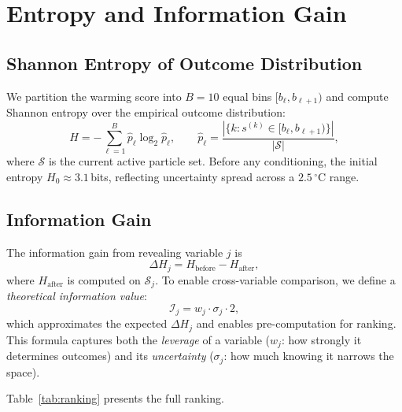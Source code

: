 \documentclass[10pt,twocolumn]{article}
\begin{document}
\section{Entropy and Information Gain}

\subsection{Shannon Entropy of Outcome Distribution}

We partition the warming score into $B=10$ equal bins
$[b_\ell, b_{\ell+1})$ and compute Shannon entropy over the
empirical outcome distribution:
\[
  H = -\sum_{\ell=1}^{B} \hat{p}_\ell \log_2 \hat{p}_\ell,
  \qquad
  \hat{p}_\ell = \frac{|\{k : s^{(k)} \in [b_\ell,b_{\ell+1})\}|}{|\mathcal{S}|},
\]
where $\mathcal{S}$ is the current active particle set.  Before any
conditioning, the initial entropy $H_0 \approx 3.1$\,bits, reflecting
uncertainty spread across a $2.5\,^\circ$C range.

\subsection{Information Gain}

The information gain from revealing variable $j$ is
\[
  \Delta H_j = H_{\text{before}} - H_{\text{after}},
\]
where $H_{\text{after}}$ is computed on $\mathcal{S}_j$.
To enable cross-variable comparison, we define a \emph{theoretical
information value}:
\[
  \mathcal{I}_j = w_j \cdot \sigma_j \cdot 2,
\]
which approximates the expected $\Delta H_j$ and enables pre-computation
for ranking.  This formula captures both the \emph{leverage} of a
variable ($w_j$: how strongly it determines outcomes) and its
\emph{uncertainty} ($\sigma_j$: how much knowing it narrows the space).

Table~\ref{tab:ranking} presents the full ranking.
\end{document}
